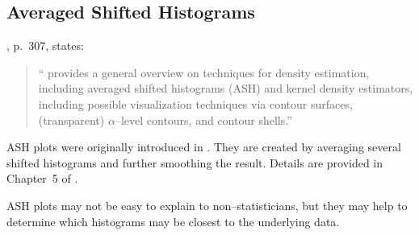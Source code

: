 \newpage 


\subsection{Averaged Shifted Histograms}


\cite{Sym2004}, p.~307, states:
\begin{quotation}
``\citet{Sc92} provides a general overview on techniques
for density estimation, including
averaged shifted histograms (ASH)
and kernel density estimators,
including possible visualization techniques via
contour surfaces,
(transparent) $\alpha$--level contours,
and contour shells.''
\end{quotation}

ASH plots were originally introduced in \citet{Sc85}.
They are created by averaging several shifted histograms
and further smoothing the result. Details are provided
in Chapter~5 of \citet{Sc92}.

ASH plots may not be easy to explain to non--statisticians,
but they may help to determine which histograms may be
closest to the underlying data.


